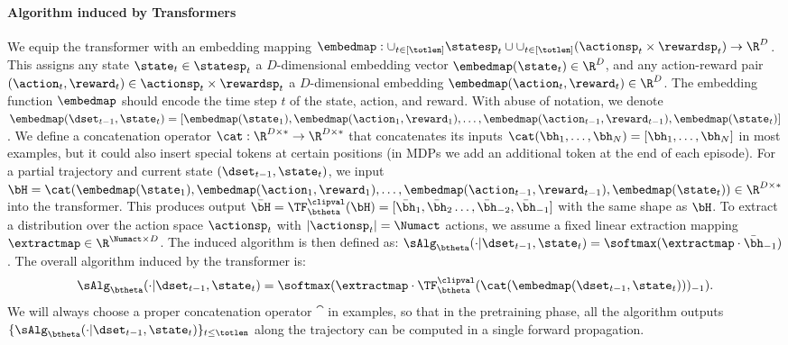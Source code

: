 \documentclass[10pt]{article}
\begin{document}
\paragraph{Algorithm induced by Transformers} We equip the transformer with an embedding mapping $\embedmap: \cup_{t \in [\totlen]} \statesp_t \cup \cup_{t \in [\totlen]} (\actionsp_t \times \rewardsp_t) \to \R^D$.  This assigns any state $\state_t \in \statesp_t$ a $D$-dimensional embedding vector $\embedmap(\state_t) \in \R^D$, and any action-reward pair $(\action_t, \reward_t) \in \actionsp_t \times \rewardsp_t$ a $D$-dimensional embedding $\embedmap(\action_t, \reward_t) \in \R^D$. The embedding function $\embedmap$ should encode the time step $t$ of the state, action, and reward. With abuse of notation, we denote $\embedmap(\dset_{t-1}, \state_t) = [\embedmap(\state_1), \embedmap(\action_1, \reward_1), \ldots, \embedmap(\action_{t-1}, \reward_{t-1}), \embedmap(\state_t)]$. We define a concatenation operator $\cat: \R^{D \times *} \to \R^{D \times *}$ that concatenates its inputs $\cat(\bh_1, \ldots, \bh_N) = [\bh_1, \ldots, \bh_N]$ in most examples, but it could also insert special tokens at certain positions (in MDPs we add an additional token at the end of each episode). For a partial trajectory and current state $(\dset_{t-1}, \state_t)$, we input $\bH = \cat(\embedmap(\state_1), \embedmap(\action_1, \reward_1), \ldots, \embedmap(\action_{t-1}, \reward_{t-1}), \embedmap(\state_t)) \in \R^{D \times *}$ into the transformer. This produces output $\bar{\bH} = \TF_{\btheta}^{\clipval}(\bH) = [\bar{\bh}_1, \bar{\bh}_2 \ldots, \bar{\bh}_{-2},\bar{\bh}_{-1}]$ with the same shape as $\bH$. To extract a distribution over the action space $\actionsp_t$ with $| \actionsp_t | = \Numact$ actions, we assume a fixed linear extraction mapping $\extractmap \in \R^{\Numact \times D}$. The induced algorithm is then defined as: $\sAlg_\btheta(\cdot | \dset_{t-1}, \state_t) = \softmax(\extractmap \cdot \bar{\bh}_{-1})$. The overall algorithm induced by the transformer is: 
\begin{equation}\label{eqn:transformer-algorithm}
\sAlg_\btheta(\cdot | \dset_{t-1}, \state_t) = \softmax ( {\extractmap} \cdot {\TF_\btheta^{\clipval}} ( {\cat}( {\embedmap} ( \dset_{t-1}, \state_t)))_{-1}). 
\end{equation}
We will always choose a proper concatenation operator $\cat$ in examples, so that in the pretraining phase, all the algorithm outputs $\{ \sAlg_\btheta(\cdot | \dset_{t-1}, \state_t) \}_{t \le \totlen}$ along the trajectory can be computed in a single forward propagation. 
\end{document}

